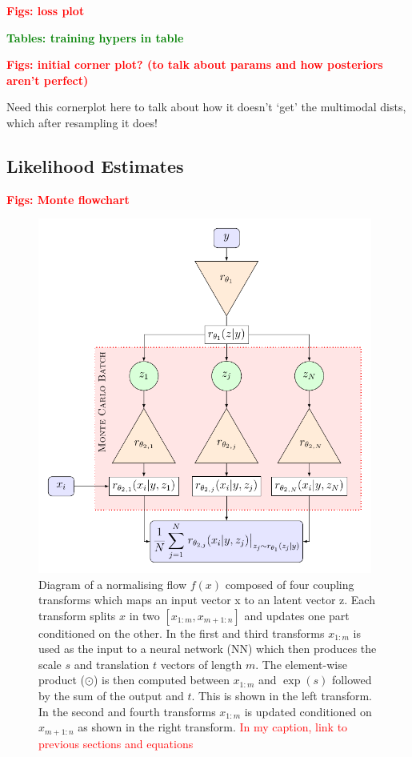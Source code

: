 \documentclass[aps,superscriptaddress,twocolumn,nopreprintnumbers,floatfix,groupedaddress]{revtex4-1}
\newcommand{\montefigwidth}{11cm}
\begin{document}
\textbf{\textcolor{red}{Figs: loss plot}}

\textbf{\textcolor{green}{Tables: training hypers in table}}

\textbf{\textcolor{red}{Figs: initial corner plot? (to talk about params and how posteriors aren't perfect)}}

Need this cornerplot here to talk about how it doesn't `get' the multimodal dists, which after resampling it does!

\subsection{Likelihood Estimates}

\textbf{\textcolor{red}{Figs: Monte flowchart}}

\begin{figure}
	\centering
	\includegraphics[width=\montefigwidth]{figs/tikz_monte.pdf}
	\caption{Diagram of a normalising flow $f(x)$ composed of four coupling transforms which maps an \protect{} input vector x to an \protect{} latent vector z. Each transform splits $x$ in two $[x_{1:m}, x_{m+1:n}]$ and updates one part conditioned on the other. In the first and third transforms $x_{1:m}$ is used as the input to a neural network (NN) which then produces the scale $s$ and translation $t$ vectors of length $m$. The element-wise product ($\odot$) is then computed between $x_{1:m}$ and $\exp(s)$ followed by the sum of the output and $t$. This is shown in the left transform. In the second and fourth transforms $x_{1:m}$ is updated conditioned on $x_{m+1:n}$ as shown in the right transform. \textcolor{red} {In my caption, link to previous sections and equations}}
	\label{fig:monte_flow}
\end{figure}
\end{document}
